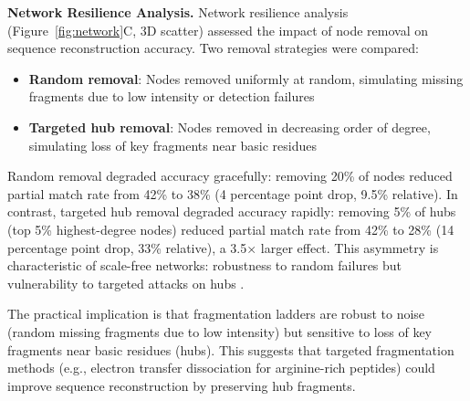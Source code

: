 \documentclass[11pt,twocolumn]{article}
\begin{document}
\textbf{Network Resilience Analysis.} Network resilience analysis (Figure~\ref{fig:network}C, 3D scatter) assessed the impact of node removal on sequence reconstruction accuracy. Two removal strategies were compared:
\begin{itemize}[leftmargin=*]
    \item \textbf{Random removal}: Nodes removed uniformly at random, simulating missing fragments due to low intensity or detection failures
    \item \textbf{Targeted hub removal}: Nodes removed in decreasing order of degree, simulating loss of key fragments near basic residues
\end{itemize}

Random removal degraded accuracy gracefully: removing 20\% of nodes reduced partial match rate from 42\% to 38\% (4 percentage point drop, 9.5\% relative). In contrast, targeted hub removal degraded accuracy rapidly: removing 5\% of hubs (top 5\% highest-degree nodes) reduced partial match rate from 42\% to 28\% (14 percentage point drop, 33\% relative), a 3.5× larger effect. This asymmetry is characteristic of scale-free networks: robustness to random failures but vulnerability to targeted attacks on hubs \cite{albert2000error}.

The practical implication is that fragmentation ladders are robust to noise (random missing fragments due to low intensity) but sensitive to loss of key fragments near basic residues (hubs). This suggests that targeted fragmentation methods (e.g., electron transfer dissociation for arginine-rich peptides) could improve sequence reconstruction by preserving hub fragments.
\end{document}
